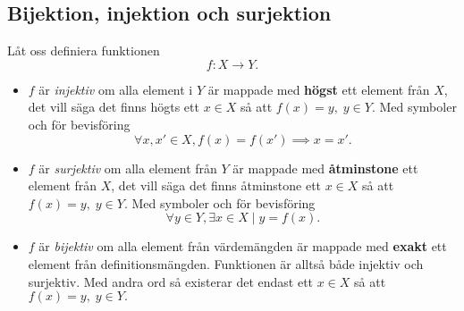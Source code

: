 \documentclass{article}
\theoremstyle{definition}
\begin{document}
\subsection{Bijektion, injektion och surjektion}
\begin{mydef}{}{}
  Låt oss definiera funktionen
  \[f: X \rightarrow Y.\]
  \begin{itemize}
    \item $f$ är \textit{injektiv} om alla element i $Y$ är mappade med \textbf{högst}
    ett element från $X$, det vill säga det finns högts ett $x \in X$ så att $f(x) = y, \; y \in Y.$
    Med symboler och för bevisföring
    \[\forall x, x' \in X, f(x) = f(x') \implies x = x'.\]
    \item $f$ är \textit{surjektiv} om alla element från 
    $Y$ är mappade med \textbf{åtminstone} ett element från $X$, det 
    vill säga det finns åtminstone ett $x \in X$ så att $f(x) = y, \; y \in Y.$
    Med symboler och för bevisföring
    \[\forall y \in Y, \exists x \in X \; | \; y = f(x).\]
    \item $f$ är \textit{bijektiv} om alla element från värdemängden är mappade med \textbf{exakt} 
    ett element från definitionsmängden. Funktionen är alltså både injektiv och surjektiv.
    Med andra ord så existerar det endast ett $x \in X$ så att $f(x) = y, \; y \in Y.$
  \end{itemize}
\end{mydef}
\end{document}
